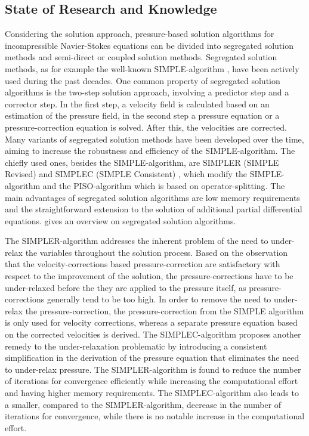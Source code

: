 \subsection{State of Research and Knowledge}

Considering the solution approach, pressure-based solution algorithms for incompressible Navier-Stokes equations can be divided into segregated solution methods and semi-direct or coupled solution methods. Segregated solution methods, as for example the well-known SIMPLE-algorithm \cite{patankar72}, have been actively used during the past decades. One common property of segregated solution algorithms is the two-step solution approach, involving a predictor step and a corrector step. In the first step, a velocity field is calculated based on an estimation of the pressure field, in the second step a pressure equation or a pressure-correction equation is solved. After this, the velocities are corrected. Many variants of segregated solution methods have been developed over the time, aiming to increase the robustness and efficiency of the SIMPLE-algorithm. The chiefly used ones, besides the SIMPLE-algorithm, are SIMPLER (SIMPLE Revised) \cite{patankar80} and SIMPLEC (SIMPLE Consistent) \cite{doormaal84}, which modify the SIMPLE-algorithm and the PISO-algorithm \cite{issa86} which is based on operator-splitting. The main advantages of segregated solution algorithms are low memory requirements and the straightforward extension to the solution of additional partial differential equations.\cite{darwish00} gives an overview on segregated solution algorithms.

The SIMPLER-algorithm addresses the inherent problem of the need to under-relax the variables throughout the solution process. Based on the observation that the velocity-corrections based pressure-correction are satisfactory with respect to the improvement of the solution, the pressure-corrections have to be under-relaxed before the they are applied to the pressure itself, as pressure-corrections generally tend to be too high. In order to remove the need to under-relax the pressure-correction, the pressure-correction from the SIMPLE algorithm is only used for velocity corrections, whereas a separate pressure equation based on the corrected velocities is derived. The SIMPLEC-algorithm proposes another remedy to the under-relaxation problematic by introducing a consistent simplification in the derivation of the pressure equation that eliminates the need to under-relax pressure. The SIMPLER-algorithm is found to reduce the number of iterations for convergence efficiently while increasing the computational effort and having higher memory requirements. The SIMPLEC-algorithm also leads to a smaller, compared to the SIMPLER-algorithm, decrease in the number of iterations for convergence, while there is no notable increase in the computational effort. 

